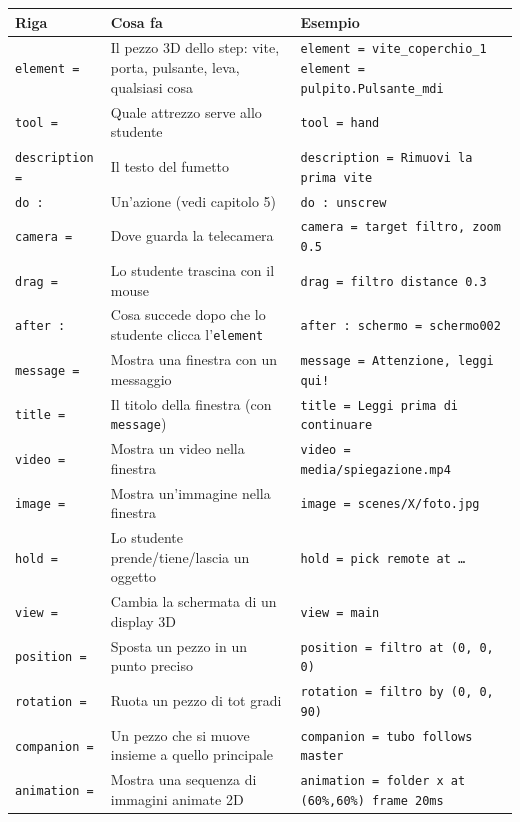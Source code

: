 ﻿\documentclass[a4paper,12pt,oneside]{book}
\newcommand{\kw}[1]{\texttt{\color{keycolor}#1}}
\begin{document}
\begin{longtable}{@{}p{3.3cm}p{4.8cm}p{6.2cm}@{}}
\toprule
\textbf{Riga} & \textbf{Cosa fa} & \textbf{Esempio} \\
\midrule
\kw{element =} & Il pezzo 3D dello step: vite, porta, pulsante, leva, qualsiasi cosa & \texttt{element = vite\_coperchio\_1} \newline \texttt{element = pulpito.Pulsante\_mdi} \\
\kw{tool =} & Quale attrezzo serve allo studente & \texttt{tool = hand} \\
\kw{description =} & Il testo del fumetto & \texttt{description = Rimuovi la prima vite} \\
\kw{do :} & Un'azione (vedi capitolo 5) & \texttt{do : unscrew} \\
\kw{camera =} & Dove guarda la telecamera & \texttt{camera = target filtro, zoom 0.5} \\
\kw{drag =} & Lo studente trascina con il mouse & \texttt{drag = filtro distance 0.3} \\
\kw{after :} & Cosa succede dopo che lo studente clicca l'\kw{element} & \texttt{after : schermo = schermo002} \\
\kw{message =} & Mostra una finestra con un messaggio & \texttt{message = Attenzione, leggi qui!} \\
\kw{title =} & Il titolo della finestra (con \kw{message}) & \texttt{title = Leggi prima di continuare} \\
\kw{video =} & Mostra un video nella finestra & \texttt{video = media/spiegazione.mp4} \\
\kw{image =} & Mostra un'immagine nella finestra & \texttt{image = scenes/X/foto.jpg} \\
\kw{hold =} & Lo studente prende/tiene/lascia un oggetto & \texttt{hold = pick remote at \ldots} \\
\kw{view =} & Cambia la schermata di un display 3D & \texttt{view = main} \\
\kw{position =} & Sposta un pezzo in un punto preciso & \texttt{position = filtro at (0, 0, 0)} \\
\kw{rotation =} & Ruota un pezzo di tot gradi & \texttt{rotation = filtro by (0, 0, 90)} \\
\kw{companion =} & Un pezzo che si muove insieme a quello principale & \texttt{companion = tubo follows master} \\
\kw{animation =} & Mostra una sequenza di immagini animate 2D & \texttt{animation = folder x at (60\%,60\%) frame 20ms} \\
\bottomrule
\end{longtable}
\end{document}
